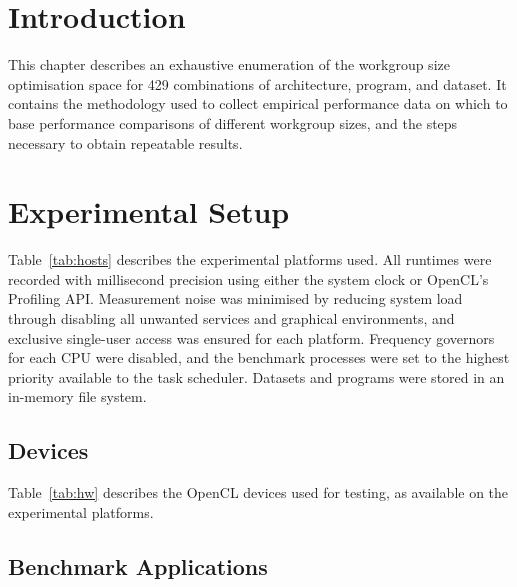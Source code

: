 \section{Introduction}

This chapter describes an exhaustive enumeration of the workgroup size
optimisation space for 429 combinations of architecture, program, and
dataset. It contains the methodology used to collect empirical
performance data on which to base performance comparisons of different
workgroup sizes, and the steps necessary to obtain repeatable results.


\section{Experimental Setup}

\begin{table}

\caption[Specification of experimental platforms]{%
  Specification of experimental platforms.%
}
\label{tab:hosts}
\end{table}

Table~\ref{tab:hosts} describes the experimental platforms used.  All
runtimes were recorded with millisecond precision using either the
system clock or OpenCL's Profiling API. Measurement noise was
minimised by reducing system load through disabling all unwanted
services and graphical environments, and exclusive single-user access
was ensured for each platform. Frequency governors for each CPU were
disabled, and the benchmark processes were set to the highest priority
available to the task scheduler. Datasets and programs were stored in
an in-memory file system.

\subsection{Devices}

\begin{table}

\caption[Specification of experimental OpenCL devices]{%
  Specification of experimental OpenCL devices.%
}
\label{tab:hw}
\end{table}

Table~\ref{tab:hw} describes the OpenCL devices used for testing, as
available on the experimental platforms.

\subsection{Benchmark Applications}

